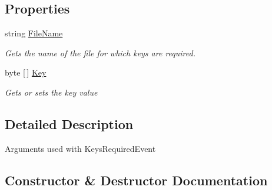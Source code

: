 \subsection*{Properties}
\begin{DoxyCompactItemize}
\item 
string \hyperlink{class_i_c_sharp_code_1_1_sharp_zip_lib_1_1_zip_1_1_keys_required_event_args_a26b681dbba09e2957afab5682b4d7a1b}{File\+Name}
\begin{DoxyCompactList}\small\item\em Gets the name of the file for which keys are required. \end{DoxyCompactList}\item 
byte \mbox{[}$\,$\mbox{]} \hyperlink{class_i_c_sharp_code_1_1_sharp_zip_lib_1_1_zip_1_1_keys_required_event_args_af0566571456f23d5443990e3f6a425fd}{Key}
\begin{DoxyCompactList}\small\item\em Gets or sets the key value \end{DoxyCompactList}\end{DoxyCompactItemize}


\subsection{Detailed Description}
Arguments used with Keys\+Required\+Event 



\subsection{Constructor \& Destructor Documentation}
\mbox{\label{class_i_c_sharp_code_1_1_sharp_zip_lib_1_1_zip_1_1_keys_required_event_args_adab155caddbe2ace5dfa7acf27c56b31}} 

